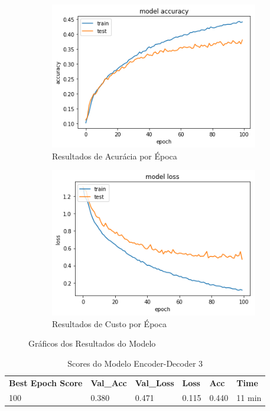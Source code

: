 \begin{figure}[H]
  \centering
  \begin{subfigure}[b]{0.45\linewidth}
    \includegraphics[width=\linewidth]{img/enc-dec-3.png}
    \caption{Resultados de Acurácia por Época}
  \end{subfigure}
  \begin{subfigure}[b]{0.45\linewidth}
    \includegraphics[width=\linewidth]{img/enc-dec-3-loss.png}
    \caption{Resultados de Custo por Época}
  \end{subfigure}
  \caption{Gráficos dos Resultados do Modelo}
  \label{fig:plots3}
\end{figure}

\begin{table}[H]
\centering
\begin{tabular}{llllll}
\textbf{Best Epoch Score} & \textbf{Val\_Acc} & \textbf{Val\_Loss} & \textbf{Loss} & \textbf{Acc} & \textbf{Time} \\
100 & 0.380 & 0.471 & 0.115 & 0.440 & 11 min
\end{tabular}
\caption{Scores do Modelo Encoder-Decoder 3}
\label{tab:res-enc-dec-3}
\end{table}

